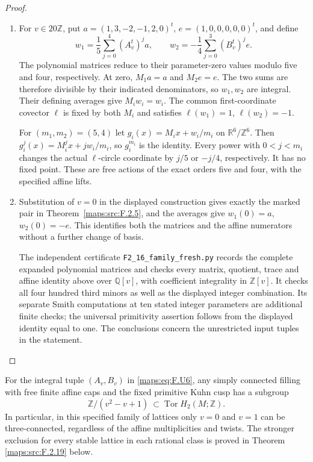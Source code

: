 \begin{proof}
\begin{enumerate}[label=\arabic*.]
\item For $v\in20\mathbb Z$, put
$a=(1,3,-2,-1,2,0)^t$, $e=(1,0,0,0,0,0)^t$, and define
\[
 w_1=\frac15\sum_{j=0}^4(A_v^t)^j a,
 \qquad
 w_2=-\frac14\sum_{j=0}^3(B_v^t)^j e.
 \tag{F.U7}\label{maps:eq:F.U7}
\]
The polynomial matrices reduce to their parameter-zero
values modulo five and four, respectively. At zero,
$M_1a=a$ and $M_2e=e$. The two sums are therefore divisible
by their indicated denominators, so $w_1,w_2$ are integral.
Their defining averages give $M_iw_i=w_i$. The common
first-coordinate covector $\ell$ is fixed by both $M_i$ and
satisfies $\ell(w_1)=1$, $\ell(w_2)=-1$.

For $(m_1,m_2)=(5,4)$ let
$g_i(x)=M_ix+w_i/m_i$ on $\mathbb R^6/\mathbb Z^6$.
Then $g_i^j(x)=M_i^jx+jw_i/m_i$, so $g_i^{m_i}$ is the
identity. Every power with $0<j<m_i$ changes the actual
$\ell$-circle coordinate by $j/5$ or $-j/4$, respectively.
It has no fixed point. These are free actions of the exact
orders five and four, with the specified affine lifts.

\item Substitution of $v=0$ in the displayed construction gives
exactly the marked pair in Theorem~\ref{maps:src:F.2.5}, and
the averages give $w_1(0)=a$, $w_2(0)=-e$. This identifies
both the matrices and the affine numerators without a further
change of basis.

The independent certificate
\texttt{F2\_16\_family\_fresh.py} records the complete expanded
polynomial matrices and checks every matrix, quotient, trace
and affine identity above over $\mathbb Q[v]$, with coefficient
integrality in $\mathbb Z[v]$. It checks all four hundred
third minors as well as the displayed integer combination.
Its separate Smith computations at ten stated integer
parameters are additional finite checks; the universal
primitivity assertion follows from the displayed identity
equal to one. The conclusions concern the unrestricted
input tuples in the statement.
\end{enumerate}
\end{proof}




\begin{proposition}\label{maps:src:F.2.17}


For the integral tuple $(A_v,B_v)$ in \eqref{maps:eq:F.U6}, any simply
connected filling with free finite affine caps and the fixed
primitive Kuhn cusp has a subgroup
\[
 \mathbb Z/(v^2-v+1)\ \subset\operatorname{Tor}H_2(M;\mathbb Z).
 \tag{F.U9}\label{maps:eq:F.U9}
\]
In particular, in this specified family of lattices only
$v=0$ and $v=1$ can be three-connected, regardless of the
affine multiplicities and twists.  The stronger exclusion for every stable lattice in each
rational class is proved in Theorem \ref{maps:src:F.2.19} below.

\end{proposition}


